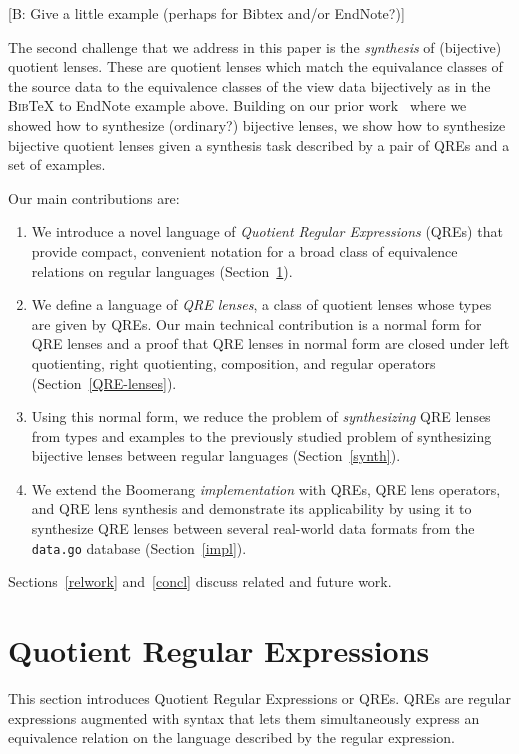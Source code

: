 \documentclass{svproc}
\newcommand{\FINISH}[3]{\ifdraft\textcolor{#1}{[#2: #3]}\fi}
\newcommand{\bcp}[1]{\FINISH{dkred}{B}{#1}}
\begin{document}
\bcp{Give a little example (perhaps for Bibtex and/or EndNote?)}

The second challenge that we address in this paper is the {\em synthesis} of
(bijective) quotient lenses. These are quotient lenses which match the
equivalance classes of the source data to the equivalence classes of the view
data bijectively as in the \textsc{Bib}\TeX{} to EndNote example above. 
Building on our prior work~\cite{popl18} where we showed how to synthesize
(ordinary?) bijective lenses, we show how to synthesize bijective quotient
lenses given a synthesis task described by a pair of QREs and a set of
examples. 

Our main contributions are:
\begin{enumerate}
\item We introduce a novel language of {\em Quotient Regular Expressions}
(QREs) that provide compact, convenient notation for a broad class of
equivalence relations on regular languages (Section~\ref{QRE}).
\item We define a language of {\em QRE lenses}, a class of quotient lenses
whose types are given by QREs.  Our main technical contribution is a normal
form for QRE lenses and a proof that QRE lenses in normal form are closed
under left quotienting, right quotienting, composition, and regular
operators (Section~\ref{QRE-lenses}).
\item Using this normal form, we reduce the problem of {\em synthesizing}
QRE lenses from types and examples to the previously studied problem of
synthesizing bijective lenses between regular languages
(Section~\ref{synth}).
\item We extend the Boomerang {\em implementation} with QREs, QRE lens operators,
and QRE lens synthesis and demonstrate its applicability by using it to
synthesize QRE lenses between several real-world data formats from the
{\tt data.go} database (Section~\ref{impl}).
\end{enumerate}
Sections~\ref{relwork} and~\ref{concl} discuss related and future work.

\section{Quotient Regular Expressions}
\label{QRE}

This section introduces Quotient Regular Expressions or QREs. QREs are regular
expressions augmented with syntax that lets them simultaneously express an
equivalence relation on the language described by the regular expression.
\end{document}
